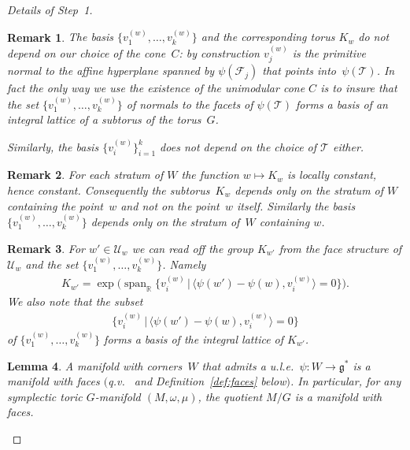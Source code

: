 \documentclass[pdftex]{sigma}
\numberwithin{equation}{section}
\newtheorem{Lemma}{Lemma}[section]
\newtheorem{Remark}[Lemma]{Remark}
\begin{document}
\begin{proof}[Details of Step~1]
\begin{Remark}
  The basis $\{v_1^{(w)},\ldots, v_k^{(w)}\}$
  and the corresponding torus $K_w$ do not depend on our choice of the
  cone~$C$:  by construction $v_j^{(w)}$ is the primitive
  normal to the af\/f\/ine hyperplane spanned by $\psi ({\mathcal F}_j)$ that
  points into~$\psi({\mathcal T})$.  In fact the only way we use the
  existence of the unimodular cone $C$ is to insure that the set
  $\{v_1^{(w)},\ldots, v_k^{(w)}\}$ of normals to the facets of
  $\psi({\mathcal T})$ forms a basis of an integral lattice of a subtorus of
  the torus~$G$.

  Similarly, the basis $\{v_i^{(w)}\}_{i=1}^k$ does not depend on the choice of
  ${\mathcal T}$ either.
\end{Remark}

\begin{Remark}
  For each stratum of $W$ the function $w\mapsto K_w$ is
  locally constant, hence constant.  Consequently the subtorus~$K_w$
  depends only on the stratum of $W$ containing the point~$w$ and
  not on the point~$w$ itself.  Similarly the basis
  $\{v_1^{(w)},\ldots, v_k^{(w)}\}$ depends only on the stratum of~$W$
  containing $w$.
\end{Remark}

\begin{Remark}\label{rmrk:2.21}
For $w'\in {\mathcal U}_w$ we can read of\/f the group $K_{w'}$ from the face structure
of ${\mathcal U}_w$ and the set $\{v_1^{(w)},\ldots, v_k^{(w)}\}$. Namely
\begin{gather*}
K_{w'} = \exp \big(\operatorname{span}_{\mathbb R} \big\{v_i^{(w)} \, | \,
   \big\langle \psi(w')-\psi(w), v_i^{(w)}\big\rangle  = 0\big\}\big).
\end{gather*}
We also note that the subset
\begin{gather*}
\big\{v_i^{(w)} \, | \,  \big\langle \psi(w')-\psi(w), v_i^{(w)} \big\rangle = 0\big\}
\end{gather*}
of $\{v_1^{(w)},\ldots, v_k^{(w)}\}$ forms a basis of the integral
lattice of $K_{w'}$.
\end{Remark}

\begin{Lemma}\label{lem:mflds-w-faces}
A manifold with corners~$W$ that admits a u.l.e.\ $\psi \colon W \to {\mathfrak g}^*$
is a manifold with faces
$($q.v.~{\rm \cite{Janich}} and Definition~{\rm \ref{def:faces}} below$)$.
In particular, for any symplectic toric $G$-manifold $(M,\omega,\mu)$,
the quotient $M/G$ is a manifold with faces.
\end{Lemma}



\end{proof}
\end{document}
